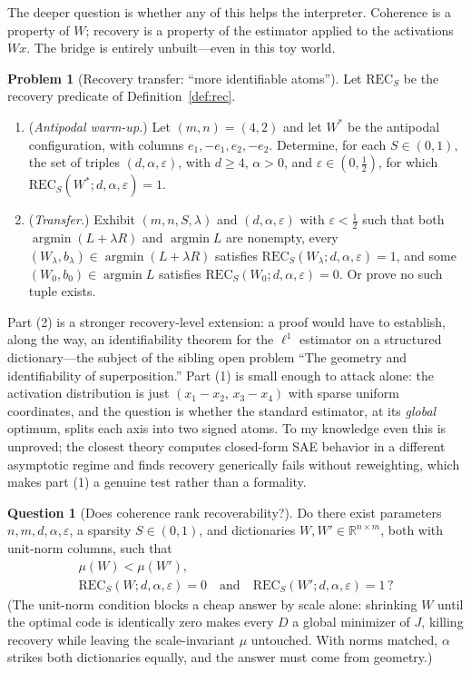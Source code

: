 \documentclass[11pt]{amsart}
\theoremstyle{plain}
\theoremstyle{definition}
\newtheorem{problem}[theorem]{Problem}
\newtheorem{question}[theorem]{Question}
\newcommand{\R}{\mathbb{R}}
\begin{document}
The deeper question is whether any of this helps the interpreter. Coherence is a property of $W$; recovery is a property of the estimator applied to the activations $Wx$. The bridge is entirely unbuilt---even in this toy world.

\begin{problem}[Recovery transfer: ``more identifiable atoms'']\label{prob:transfer}
Let $\mathrm{REC}_S$ be the recovery predicate of Definition~\ref{def:rec}.
\begin{enumerate}
\item (\emph{Antipodal warm-up.}) Let $(m,n)=(4,2)$ and let $W^*$ be the antipodal configuration, with columns $e_1,-e_1,e_2,-e_2$. Determine, for each $S\in(0,1)$, the set of triples $(d,\alpha,\varepsilon)$, with $d\ge4$, $\alpha>0$, and $\varepsilon\in(0,\tfrac12)$, for which $\mathrm{REC}_S(W^*;d,\alpha,\varepsilon)=1$.
\item (\emph{Transfer.}) Exhibit $(m,n,S,\lambda)$ and $(d,\alpha,\varepsilon)$ with $\varepsilon<\tfrac12$ such that both $\operatorname{argmin}(L+\lambda R)$ and $\operatorname{argmin}L$ are nonempty, every $(W_\lambda,b_\lambda)\in\operatorname{argmin}(L+\lambda R)$ satisfies $\mathrm{REC}_S(W_\lambda;d,\alpha,\varepsilon)=1$, and some $(W_0,b_0)\in\operatorname{argmin} L$ satisfies $\mathrm{REC}_S(W_0;d,\alpha,\varepsilon)=0$. Or prove no such tuple exists.
\end{enumerate}
\end{problem}

Part (2) is a stronger recovery-level extension: a proof would have to establish, along the way, an identifiability theorem for the $\ell^1$ estimator on a structured dictionary---the subject of the sibling open problem ``The geometry and identifiability of superposition.'' Part (1) is small enough to attack alone: the activation distribution is just $(x_1-x_2,\,x_3-x_4)$ with sparse uniform coordinates, and the question is whether the standard estimator, at its \emph{global} optimum, splits each axis into two signed atoms. To my knowledge even this is unproved; the closest theory \cite{cui2025} computes closed-form SAE behavior in a different asymptotic regime and finds recovery generically fails without reweighting, which makes part (1) a genuine test rather than a formality.

\begin{question}[Does coherence rank recoverability?]\label{q:goodhart}
Do there exist parameters $n,m,d,\alpha,\varepsilon$, a sparsity $S\in(0,1)$, and dictionaries $W,W'\in\R^{n\times m}$, both with unit-norm columns, such that
\[
\begin{gathered}
\mu(W)<\mu(W'),\\
\mathrm{REC}_S(W;d,\alpha,\varepsilon)=0
\quad\text{and}\quad
\mathrm{REC}_S(W';d,\alpha,\varepsilon)=1\,?
\end{gathered}
\]
(The unit-norm condition blocks a cheap answer by scale alone: shrinking $W$ until the optimal code is identically zero makes every $D$ a global minimizer of $J$, killing recovery while leaving the scale-invariant $\mu$ untouched. With norms matched, $\alpha$ strikes both dictionaries equally, and the answer must come from geometry.)
\end{question}
\end{document}
